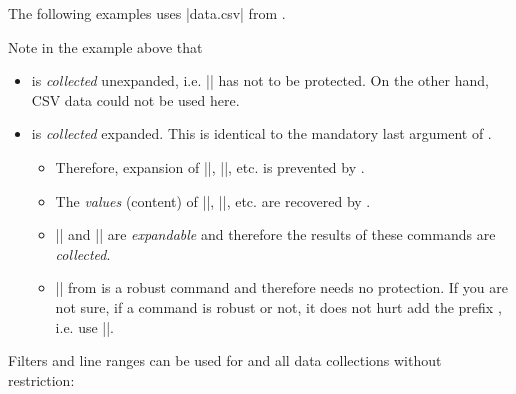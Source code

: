\documentclass[a4paper,11pt]{ltxdoc}
\begin{document}
The following examples uses |data.csv| from .

\begin{dispExample}
\end{dispExample}

Note in the example above that
\begin{itemize}
\item {} is \emph{collected} unexpanded, i.e.
  |\SetCell| has not to be protected. On the other hand, CSV data could not
  be used here.
\item {} is \emph{collected} expanded. This is identical
  to the mandatory last argument of .
  \begin{itemize}
  \item Therefore, expansion of |\SetRow|, |\SetCell|, etc. is prevented by .
  \item The \emph{values} (content) of |\land|, |\group|, etc. are recovered by
        .
  \item |\ifcsvstrcmp| and |\fpeval| are \emph{expandable} and therefore the
    results of these commands are \emph{collected}.
  \item |\tablenum| from  is a robust command and therefore
    needs no protection. If you are not sure, if a command is robust or not, it
    does not hurt add the prefix , i.e. use |\csvexpnot\tablenum|.
  \end{itemize}
\end{itemize}

\clearpage

Filters and line ranges can be used for  and all
data collections without restriction:
\end{document}
